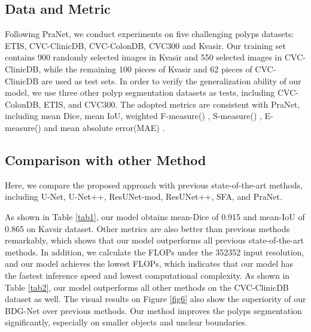 \documentclass[]{spie}
\begin{document}
\subsection{Data and Metric}
Following PraNet\cite{fan2020pranet}, we conduct experiments on ﬁve challenging polyps datasets: ETIS\cite{silva2014toward}, CVC-ClinicDB\cite{bernal2015wm}, CVC-ColonDB\cite{tajbakhsh2015automated}, CVC300\cite{vazquez2017benchmark} and Kvasir\cite{jha2020kvasir}. Our training set contains 900 randomly selected images in Kvasir and 550 selected images in CVC-ClinicDB, while the remaining 100 pieces of Kvasir and 62 pieces of CVC-ClinicDB are used as test sets. In order to verify the generalization ability of our model, we use three other polyp segmentation datasets as tests, including CVC-ColonDB, ETIS, and CVC300.
The adopted metrics are consistent with PraNet, including mean Dice, mean IoU, weighted F-measure() \cite{margolin2014evaluate}, S-measure() \cite{fan2017structure}, E-measure() \cite{fan2018enhanced} and mean absolute error(MAE) \cite{perazzi2012saliency}. 

\subsection{Comparison with other Method}
Here, we compare the proposed approach with previous state-of-the-art methods, including U-Net\cite{ronneberger2015u}, U-Net++\cite{zhou2018unet++}, ResUNet-mod\cite{zhang2018road}, ResUNet++\cite{jha2019resunet++}, SFA\cite{fang2019selective}, and PraNet\cite{fan2020pranet}. 

As shown in Table \ref{tab1}, our model obtains mean-Dice of 0.915 and mean-IoU of 0.865 on Kavsir dataset. Other metrics are also better than previous methods remarkably, which shows that our model outperforms all previous state-of-the-art methods. In addition, we calculate the FLOPs under the 352352 input resolution, and our model achieves the lowest FLOPs, which indicates that our model has the fastest inference speed and lowest computational complexity. As shown in Table \ref{tab2}, our model outperforms all other methods on the CVC-ClinicDB dataset as well. The visual results on Figure \ref{fig6} also show the superiority of our BDG-Net over previous methods. Our method improves the polyps segmentation significantly, especially on smaller objects and unclear boundaries.
\end{document}
